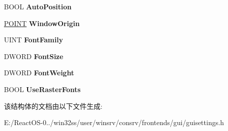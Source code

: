 \begin{DoxyCompactItemize}
B\+O\+OL {\bfseries Auto\+Position}
\item 
\mbox{\label{struct___g_u_i___c_o_n_s_o_l_e___i_n_f_o_a45b6a11c6de95fa105e2505cfbbdece0}} 
\hyperlink{structtag_p_o_i_n_t}{P\+O\+I\+NT} {\bfseries Window\+Origin}
\item 
\mbox{\label{struct___g_u_i___c_o_n_s_o_l_e___i_n_f_o_a9d8772376eace9f440c01a1d261f6bcc}} 
U\+I\+NT {\bfseries Font\+Family}
\item 
\mbox{\label{struct___g_u_i___c_o_n_s_o_l_e___i_n_f_o_aa4a82fc9bb3c87a65dabc1824f8f0c54}} 
D\+W\+O\+RD {\bfseries Font\+Size}
\item 
\mbox{\label{struct___g_u_i___c_o_n_s_o_l_e___i_n_f_o_adc27ab42b6ad4184620195bbb137927d}} 
D\+W\+O\+RD {\bfseries Font\+Weight}
\item 
\mbox{\label{struct___g_u_i___c_o_n_s_o_l_e___i_n_f_o_aff6ef49cdb2e5a3f8ad698d4332dbea3}} 
B\+O\+OL {\bfseries Use\+Raster\+Fonts}
\end{DoxyCompactItemize}


该结构体的文档由以下文件生成\+:\begin{DoxyCompactItemize}
\item 
E\+:/\+React\+O\+S-\/0../win32ss/user/winsrv/consrv/frontends/gui/guisettings.\+h\end{DoxyCompactItemize}
